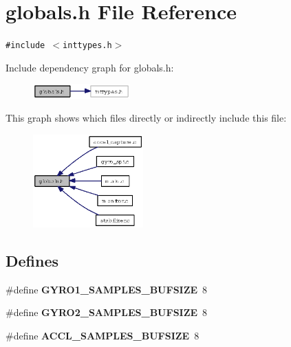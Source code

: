\section{globals.h File Reference}
\label{globals_8h}
{\tt \#include $<$inttypes.h$>$}\par


Include dependency graph for globals.h:\begin{figure}[H]
\begin{center}
\leavevmode
\includegraphics[width=106pt]{globals_8h__incl}
\end{center}
\end{figure}


This graph shows which files directly or indirectly include this file:\begin{figure}[H]
\begin{center}
\leavevmode
\includegraphics[width=120pt]{globals_8h__dep__incl}
\end{center}
\end{figure}
\subsection*{Defines}
\begin{CompactItemize}
\item 
\#define {\bf GYRO1\_\-SAMPLES\_\-BUFSIZE}~8
\item 
\#define {\bf GYRO2\_\-SAMPLES\_\-BUFSIZE}~8
\item 
\#define {\bf ACCL\_\-SAMPLES\_\-BUFSIZE}~8
\end{CompactItemize}
